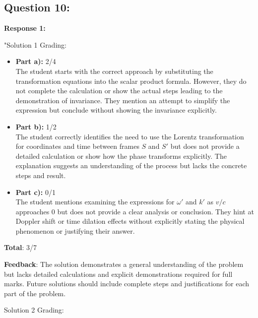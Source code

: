 \documentclass[a4paper,11pt]{article}
\begin{document}
\subsection*{Question 10:}

\textbf{Response 1:}

"Solution 1 Grading:

\begin{itemize}
    \item \textbf{Part a):} 2/4 \\
    The student starts with the correct approach by substituting the transformation equations into the scalar product formula. However, they do not complete the calculation or show the actual steps leading to the demonstration of invariance. They mention an attempt to simplify the expression but conclude without showing the invariance explicitly.
    
    \item \textbf{Part b):} 1/2 \\
    The student correctly identifies the need to use the Lorentz transformation for coordinates and time between frames \( S \) and \( S' \) but does not provide a detailed calculation or show how the phase transforms explicitly. The explanation suggests an understanding of the process but lacks the concrete steps and result.
    
    \item \textbf{Part c):} 0/1 \\
    The student mentions examining the expressions for \( \omega' \) and \( k' \) as \( v/c \) approaches \( 0 \) but does not provide a clear analysis or conclusion. They hint at Doppler shift or time dilation effects without explicitly stating the physical phenomenon or justifying their answer.
\end{itemize}

\textbf{Total}: 3/7

\textbf{Feedback}: The solution demonstrates a general understanding of the problem but lacks detailed calculations and explicit demonstrations required for full marks. Future solutions should include complete steps and justifications for each part of the problem.

Solution 2 Grading:
\end{document}
